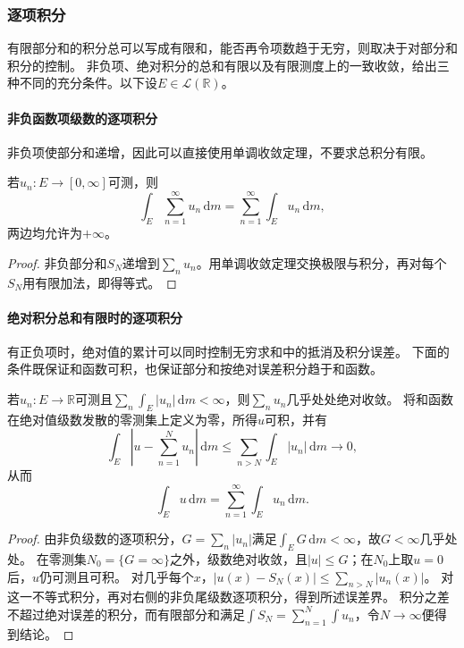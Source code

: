 \subsubsection{逐项积分}

有限部分和的积分总可以写成有限和，能否再令项数趋于无穷，则取决于对部分和积分的控制。
非负项、绝对积分的总和有限以及有限测度上的一致收敛，给出三种不同的充分条件。以下设$E\in\mathcal L(\mathbb R)$。

\paragraph{非负函数项级数的逐项积分}
非负项使部分和递增，因此可以直接使用单调收敛定理，不要求总积分有限。
\begin{theorem}[非负函数项级数的逐项积分]
\label{thm:analysis-nonnegative-series-integration}
若$u_n:E\to[0,\infty]$可测，则
\[
 \int_E\sum_{n=1}^{\infty}u_n\,\mathrm dm
 =\sum_{n=1}^{\infty}\int_Eu_n\,\mathrm dm,
\]
两边均允许为$+\infty$。
\end{theorem}
\begin{proof}
非负部分和$S_N$递增到$\sum_nu_n$。用单调收敛定理交换极限与积分，再对每个$S_N$用有限加法，即得等式。
\end{proof}

\paragraph{绝对积分总和有限时的逐项积分}
有正负项时，绝对值的累计可以同时控制无穷求和中的抵消及积分误差。
下面的条件既保证和函数可积，也保证部分和按绝对误差积分趋于和函数。
\begin{theorem}[绝对积分可求和的函数项级数]
\label{thm:analysis-absolutely-integrable-series}
若$u_n:E\to\mathbb R$可测且$\sum_n\int_E|u_n|\,\mathrm dm<\infty$，则$\sum_nu_n$几乎处处绝对收敛。
将和函数在绝对值级数发散的零测集上定义为零，所得$u$可积，并有
\[
 \int_E\left|u-\sum_{n=1}^Nu_n\right|\,\mathrm dm
 \leq\sum_{n>N}\int_E|u_n|\,\mathrm dm\longrightarrow0,
\]
从而
\[
 \int_Eu\,\mathrm dm=\sum_{n=1}^{\infty}\int_Eu_n\,\mathrm dm.
\]
\end{theorem}
\begin{proof}
由非负级数的逐项积分，$G=\sum_n|u_n|$满足$\int_EG\,\mathrm dm<\infty$，故$G<\infty$几乎处处。
在零测集$N_0=\{G=\infty\}$之外，级数绝对收敛，且$|u|\leq G$；在$N_0$上取$u=0$后，$u$仍可测且可积。
对几乎每个$x$，$|u(x)-S_N(x)|\leq\sum_{n>N}|u_n(x)|$。
对这一不等式积分，再对右侧的非负尾级数逐项积分，得到所述误差界。
积分之差不超过绝对误差的积分，而有限部分和满足$\int S_N=\sum_{n=1}^N\int u_n$，令$N\to\infty$便得到结论。
\end{proof}

